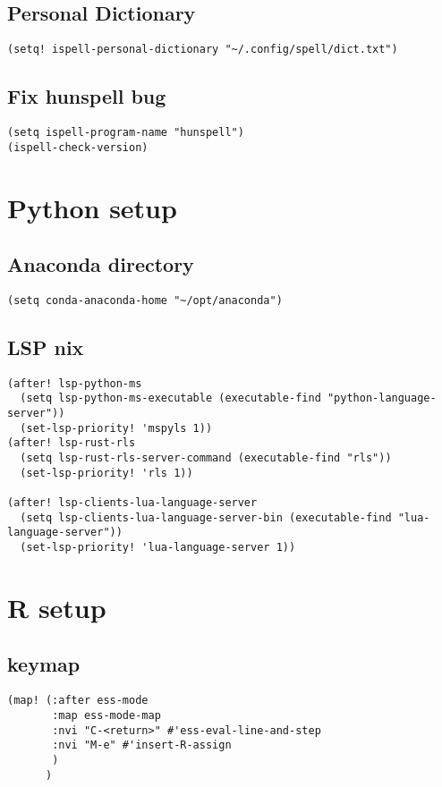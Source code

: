 \documentclass[11pt]{article}
\begin{document}
\subsection{Personal Dictionary}
\label{sec:org63bc00e}
\begin{verbatim}
(setq! ispell-personal-dictionary "~/.config/spell/dict.txt")
\end{verbatim}
\subsection{Fix hunspell bug}
\label{sec:orge099d1b}
\begin{verbatim}
(setq ispell-program-name "hunspell")
(ispell-check-version)
\end{verbatim}

\section{Python setup}
\label{sec:org4ec4e34}

\subsection{Anaconda directory}
\label{sec:org0247551}
\begin{verbatim}
(setq conda-anaconda-home "~/opt/anaconda")
\end{verbatim}
\subsection{LSP nix}
\label{sec:org78f201f}
\begin{verbatim}
(after! lsp-python-ms
  (setq lsp-python-ms-executable (executable-find "python-language-server"))
  (set-lsp-priority! 'mspyls 1))
(after! lsp-rust-rls
  (setq lsp-rust-rls-server-command (executable-find "rls"))
  (set-lsp-priority! 'rls 1))

(after! lsp-clients-lua-language-server
  (setq lsp-clients-lua-language-server-bin (executable-find "lua-language-server"))
  (set-lsp-priority! 'lua-language-server 1))
\end{verbatim}

\section{R setup}
\label{sec:org5dd4867}
\subsection{keymap}
\label{sec:org2f98fc1}
\begin{verbatim}
(map! (:after ess-mode
       :map ess-mode-map
       :nvi "C-<return>" #'ess-eval-line-and-step
       :nvi "M-e" #'insert-R-assign
       )
      )
\end{verbatim}
\end{document}
